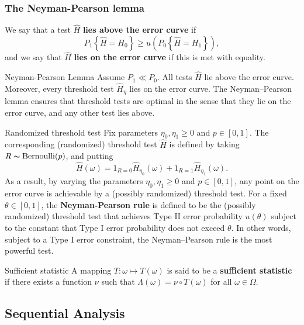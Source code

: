 \subsubsection{The Neyman-Pearson lemma}

We say that a test \(\hat{H} \) \textbf{lies above the error curve} if 
\[
    P_1 \left\{ \hat{H} = H _0 \right\} \geq u(P_0 \left\{ \hat{H} = H_1 \right\} ),
\]
and we say that \(\hat{H} \) \textbf{lies on the error curve} if this is met with equality. 

\begin{thrm}{Neyman-Pearson Lemma}{} 
Assume \(P_1 \ll P_0\). All tests \(\hat{H} \) lie above the error curve. Moreover, every threshold test \(\hat{H} _\eta \) lies on the error curve. The Neyman–Pearson lemma ensures that threshold tests are optimal
in the sense that they lie on the error curve, and any other test lies above. 
\end{thrm}

\begin{defn}{Randomized threshold test}{}
    Fix parameters \(\eta _0, \eta _1\geq 0\) and \(p \in [0,1]\). The corresponding (randomized) threshold test \(\hat{H} \) is defined by taking \(R \thicksim \mathrm{Bernoulli}(p) \), and putting 
    \[
        \hat{H} (\omega ) = 1_{R = 0} \hat{H} _{\eta _0}(\omega ) + 1_{R = 1}\hat{H} _{\eta _1}(\omega ). 
    \]
    As a result, by varying the parameters \(\eta _ 0, \eta _1 \geq 0\) and \(p \in [0,1]\), any point on the error curve is achievable by a (possibly randomized) threshold test. For a fixed \(\theta \in [0,1]\), the \textbf{Neyman-Pearson rule} is defined to be the (possibly randomized) threshold test that achieves Type II error probability \(u(\theta )\) subject to the constant that Type I error probability does not exceed \(\theta \).  In other words, subject to a Type I error constraint, the Neyman–Pearson
    rule is the most powerful test.
\end{defn}

\begin{defn}{Sufficient statistic}{}
    A mapping \(T: \omega \mapsto T(\omega )\) is said to be a \textbf{sufficient statistic} if there exists a function \(\nu   \) such that  \(\Lambda (\omega ) = \nu \circ T(\omega )\) for all \(\omega \in \Omega \). 

\end{defn}

\subsection{Sequential Analysis}

